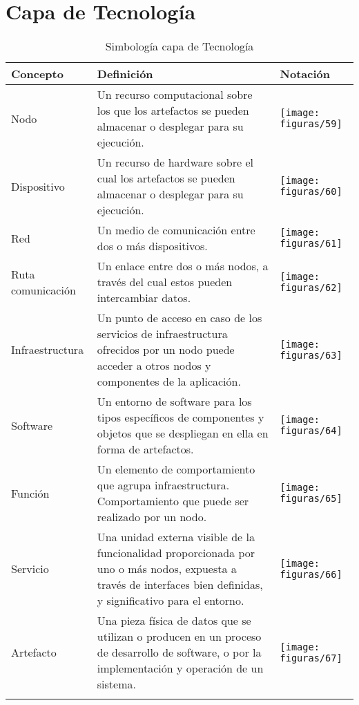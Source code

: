 \section{Capa de Tecnología}
  \begin{longtable}
  	{m{3cm}m{4.8cm}m{5.2cm}}
  	\hline
  	\rowcolor[HTML]{0073a1}
  	{\color[HTML]{FFFFFF} \textbf{Concepto}} & {\color[HTML]{FFFFFF} \textbf{Definición}} & {\color[HTML]{FFFFFF} \textbf{Notación}} \\
  	\hline
	Nodo & Un recurso computacional sobre los que los artefactos se pueden almacenar o desplegar para su ejecución. & \texttt{[image: figuras/59]} \\ \hline
	Dispositivo & Un recurso de hardware sobre el cual los artefactos se pueden almacenar o desplegar para su ejecución. & \texttt{[image: figuras/60]} \\ \hline
	Red & Un medio de comunicación entre dos o más dispositivos. & \texttt{[image: figuras/61]} \\ \hline
	Ruta comunicación & Un enlace entre dos o más nodos, a través del cual estos pueden intercambiar datos. & \texttt{[image: figuras/62]} \\ \hline
	Infraestructura\index{Infraestructura} & Un punto de acceso en caso de los servicios de infraestructura ofrecidos por un nodo puede acceder a otros nodos y componentes de la aplicación. & \texttt{[image: figuras/63]} \\ \hline
	Software\index{Software} & Un entorno de software para los tipos específicos de componentes y objetos que se despliegan en ella en forma de artefactos. & \texttt{[image: figuras/64]} \\ \hline
	Función & Un elemento de comportamiento que agrupa infraestructura. Comportamiento\index{Comportamiento} que puede ser realizado por un nodo. & \texttt{[image: figuras/65]} \\ \hline
	Servicio\index{Servicio} & Una unidad externa visible de la funcionalidad proporcionada por uno o más nodos, expuesta a través de interfaces bien definidas, y significativo para el entorno. & \texttt{[image: figuras/66]} \\ \hline
	Artefacto\index{Artefacto} & Una pieza física de datos que se utilizan o producen en un proceso de desarrollo de software, o por la implementación y operación de un sistema. & \texttt{[image: figuras/67]} \\
	\bottomrule
	\captionsetup{width=.95\textwidth}
	\caption{Simbología\index{Simbología} capa de Tecnología\index{Tecnología} \cite{ref9}}
	\label{tabla31}
  \end{longtable}
  
